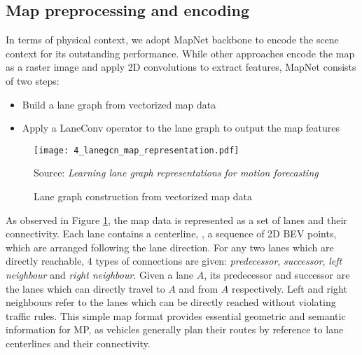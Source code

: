 \subsection{Map preprocessing and encoding}
\label{subsec:4_improving_efficiency_map_preprocessing_and_encoding}

In terms of physical context, we adopt MapNet \cite{liang2020learning} backbone to encode the scene context for its outstanding performance. %
While other approaches encode the map as a raster image and apply 2D convolutions to extract features, MapNet consists of two steps:

\begin{itemize}
	\item Build a lane graph from vectorized map data
	\item Apply a LaneConv operator to the lane graph to output the map features
\end{itemize}

\begin{figure}[h] 
	\centering
	\texttt{[image: 4\_lanegcn\_map\_representation.pdf]}
	\caption{Lane graph construction from vectorized map data}
	Source: \textit{Learning lane graph representations for motion forecasting} \cite{liang2020learning}
	\label{fig:4_improving_efficiency_lanegcn_map_representation}
\end{figure}

As observed in Figure \ref{fig:4_improving_efficiency_lanegcn_map_representation}, the map data is represented as a set of lanes and their connectivity. Each lane contains a centerline, \ie, a sequence of 2D BEV points, which are arranged following the lane direction. For any two lanes which are directly reachable, $4$ types of connections are given: \textit{predecessor}, \textit{successor}, \textit{left neighbour} and \textit{right neighbour}. Given a lane $A$, its predecessor and successor are the lanes which can directly travel to $A$ and from $A$ respectively. Left and right neighbours refer to the  lanes which can be directly reached without violating traffic rules. This simple map format provides essential geometric and semantic information for \ac{MP}, as vehicles generally plan their routes by reference to lane centerlines and their connectivity. 

